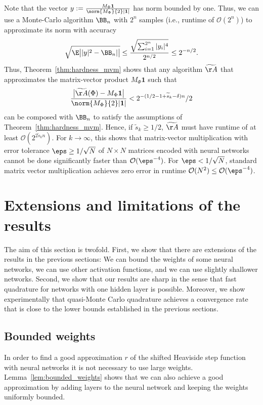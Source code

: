 \documentclass{amsart}[11pt]
\numberwithin{equation}{section}
\newcommand{\order}{\mathcal{O}}
\numberwithin{theorem}{section}
\begin{document}
    \begin{remark}
    Note that the vector $y:=\frac{M_{\Phi}\boldsymbol{1}}{\norm{M_{\Phi}}{2}|\boldsymbol{1}|}$ has norm bounded by one. Thus, we can use a Monte-Carlo algorithm $\BB_n$ with $2^{n}$ samples (i.e., runtime of $\order(2^n)$)  to approximate its norm with accuracy
    \begin{align*}
    \sqrt{\E\big| |y|^2 - \BB_n|\big|} \leq \frac{ \sqrt{\sum_{i=1}^{2^n} |y_i|^4}}{2^{n/2}} \leq 2^{-n/2}.
    \end{align*}
     Thus, Theorem~\ref{thm:hardness_mvm} shows that any algorithm $\widetilde \AA$ that approximates the matrix-vector product $M_{\Phi}\boldsymbol{1}$ such that
    \begin{align*}
        \frac{\big|\widetilde\AA(\Phi) - M_{\Phi}\boldsymbol{1}\big|}{\norm{M_{\Phi}}{2}|\boldsymbol{1}|}< 2^{-(1/2-1+\widetilde s_k -\delta)n}/2
    \end{align*}
    can be composed with $\BB_n$ to satisfy the assumptions of Theorem~\ref{thm:hardness_mvm}. Hence, if $\widetilde s_k\geq 1/2$, $\widetilde \AA$ must have runtime of at least $\order(2^{2\widetilde s_k n})$. For $k\to \infty$, this shows that matrix-vector multiplication with error tolerance $\eps\geq 1/\sqrt{N}$ of $N\times N$ matrices encoded with neural networks cannot be done significantly faster than $\order(\eps^{-4})$. For $\eps<1/\sqrt{N}$, standard matrix vector multiplication achieves zero error in runtime $\order(N^2)\leq \order(\eps^{-4})$.
    \end{remark}



\section{Extensions and limitations of the results}\label{sec:extensions}

The aim of this section is twofold. First, we show that there are extensions of the results in the previous sections: We can bound the weights of some neural networks, we can use other activation functions, and we can use slightly shallower networks. Second, we show that our results are sharp in the sense that fast quadrature for networks with one hidden layer is possible. Moreover, we show experimentally that quasi-Monte Carlo quadrature achieves a convergence rate that is close to the lower bounds established in the previous sections.

\subsection{Bounded weights}
In order to find a good approximation $r$ of the shifted Heaviside step function with neural networks it is not necessary to use large weights. Lemma~\ref{lem:bounded_weights} shows that we can also achieve a good approximation by adding layers to the neural network and keeping the weights uniformly bounded.
\end{document}
